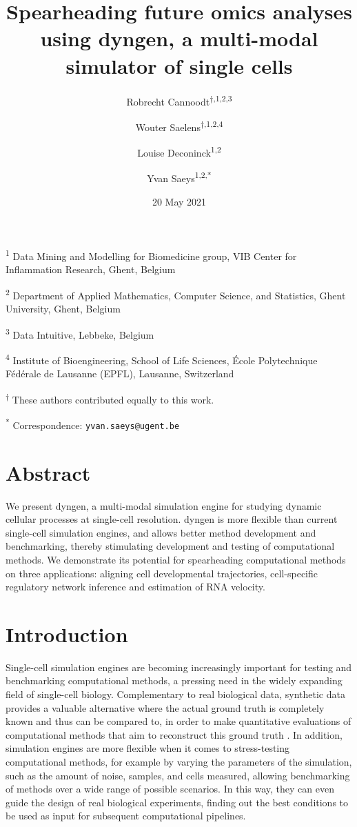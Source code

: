 \documentclass[10pt, a4paper]{article}
\title{Spearheading future omics analyses using dyngen, a multi-modal simulator of single cells}
\author{Robrecht Cannoodt\textsuperscript{$\dagger{}$,1,2,3} \and Wouter Saelens\textsuperscript{$\dagger{}$,1,2,4} \and Louise Deconinck\textsuperscript{1,2} \and Yvan Saeys\textsuperscript{1,2,*}}
\date{20 May 2021}
\begin{document}
\maketitle

\textsuperscript{1} Data Mining and Modelling for Biomedicine group, VIB
Center for Inflammation Research, Ghent, Belgium

\textsuperscript{2} Department of Applied Mathematics, Computer Science,
and Statistics, Ghent University, Ghent, Belgium

\textsuperscript{3} Data Intuitive, Lebbeke, Belgium

\textsuperscript{4} Institute of Bioengineering, School of Life
Sciences, École Polytechnique Fédérale de Lausanne (EPFL), Lausanne,
Switzerland

\textsuperscript{$\dagger{}$} These authors contributed equally to this work.

\textsuperscript{*} Correspondence: \texttt{yvan.saeys@ugent.be}

\hypertarget{abstract}{%
	\section*{Abstract}\label{abstract}}

We present dyngen, a multi-modal simulation engine for studying dynamic
cellular processes at single-cell resolution. dyngen is more flexible
than current single-cell simulation engines, and allows better method
development and benchmarking, thereby stimulating development and
testing of computational methods. We demonstrate its potential for
spearheading computational methods on three applications: aligning cell
developmental trajectories, cell-specific regulatory network inference
and estimation of RNA velocity.

\hypertarget{introduction}{%
	\section*{Introduction}\label{introduction}}

Single-cell simulation engines are becoming increasingly important for
testing and benchmarking computational methods, a pressing need in the
widely expanding field of single-cell biology. Complementary to real
biological data, synthetic data provides a valuable alternative where
the actual ground truth is completely known and thus can be compared to,
in order to make quantitative evaluations of computational methods that
aim to reconstruct this ground truth
\cite{zappia_splattersimulationsinglecell_2017}. In addition,
simulation engines are more flexible when it comes to stress-testing
computational methods, for example by varying the parameters of the
simulation, such as the amount of noise, samples, and cells measured,
allowing benchmarking of methods over a wide range of possible
scenarios. In this way, they can even guide the design of real
biological experiments, finding out the best conditions to be used as
input for subsequent computational pipelines.
\end{document}
